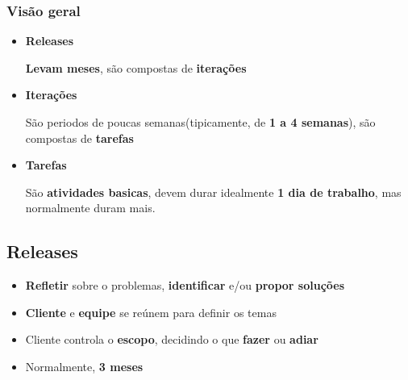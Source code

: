 \documentclass[10pt]{beamer}
\begin{document}
\begin{frame}
  \frametitle{Visão geral}
  \begin{itemize}%
  \item \textbf{Releases}
    \begin{block}{}
      \textbf{Levam meses}, são compostas de \textbf{iterações}
    \end{block}
  \item \textbf{Iterações}
    \begin{block}{}
      São periodos de poucas semanas(tipicamente, de \textbf{1 a 4 semanas}), são compostas de \textbf{tarefas}
    \end{block}
  \item \textbf{Tarefas}
    \begin{block}{}
      São \textbf{atividades basicas}, devem durar idealmente \textbf{1 dia de trabalho}, mas normalmente duram mais.
    \end{block}
  \end{itemize}
\end{frame}


\subsection{Releases}

\begin{frame}
  \begin{figure}
    \centering
  \end{figure}
  \begin{itemize}%
    \item \textbf{Refletir} sobre o problemas, \textbf{identificar} e/ou \textbf{propor soluções}
    \item \textbf{Cliente} e \textbf{equipe} se reúnem para definir os temas
    \item Cliente controla o \textbf{escopo}, decidindo o que \textbf{fazer} ou \textbf{adiar}
    \item Normalmente, \textbf{3 meses}
  \end{itemize}
\end{frame}
\end{document}
